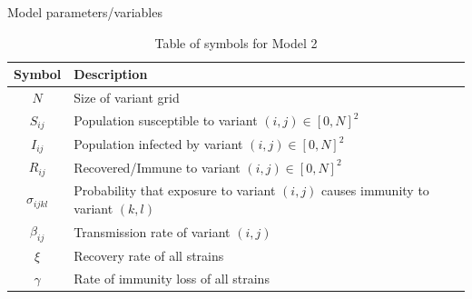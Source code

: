 \documentclass{beamer}
\begin{document}

\begin{frame}{Model parameters/variables}
    \begin{table}[h!]
        \begin{center}
        \begin{tabular}{c|p{8cm}}
                Symbol & Description \\
                \hline
                \hline
                $N$ & Size of variant grid \\
                $S_{ij}$ & Population susceptible to variant $(i,j) \in [0,N]^2$ \\
                $I_{ij}$ & Population infected by variant $(i,j) \in [0,N]^2$\\
                $R_{ij}$ & Recovered/Immune to variant $(i,j) \in [0,N]^2$\\
                $\sigma_{ijkl}$ & Probability that exposure to variant $(i,j)$ causes immunity \newline to variant $(k,l)$\\
                $\beta_{ij}$ & Transmission rate of variant $(i,j)$\\
                $\xi$ & Recovery rate of all strains \\
                $\gamma$ & Rate of immunity loss of all strains \\
        \end{tabular}
        \caption{Table of symbols for Model 2}
    
        \label{variables_2}
        \end{center}
    \end{table}
\end{frame}
\end{document}
